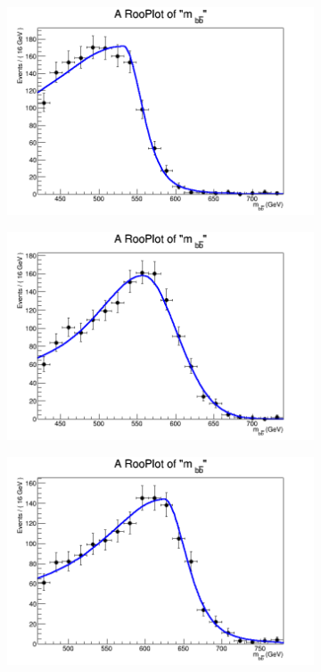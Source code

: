 \begin{figure}[phtb!]
\begin{center}
  \begin{subfigure}[$m_{A}=550$ GeV]{0.4\textwidth}\includegraphics[width=\textwidth]{FitResults/images/fitMC_bAbb550_4.png}\end{subfigure}
  \begin{subfigure}[$m_{A}=600$ GeV]{0.4\textwidth}\includegraphics[width=\textwidth]{FitResults/images/fitMC_bAbb600_4.png}\end{subfigure}
  \begin{subfigure}[$m_{A}=650$ GeV]{0.4\textwidth}\includegraphics[width=\textwidth]{FitResults/images/fitMC_bAbb650_4.png}\end{subfigure}

\end{center}
\end{figure}

